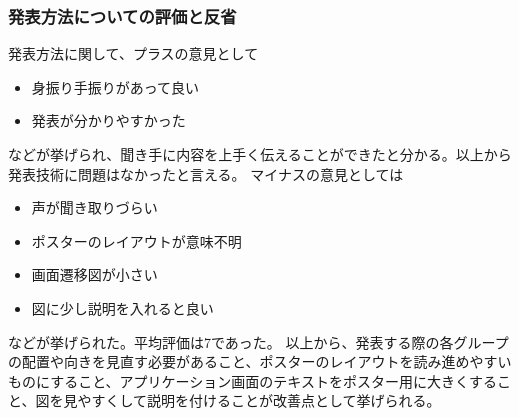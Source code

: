 \documentclass[openany,11pt,papersize]{jsbook}
\begin{document}
\subsubsection{発表方法についての評価と反省}
発表方法に関して、プラスの意見として
\begin{itemize}

\item 身振り手振りがあって良い
\item 発表が分かりやすかった

\end{itemize}
などが挙げられ、聞き手に内容を上手く伝えることができたと分かる。以上から発表技術に問題はなかったと言える。
マイナスの意見としては
\begin{itemize}

\item 声が聞き取りづらい
\item ポスターのレイアウトが意味不明
\item 画面遷移図が小さい
\item 図に少し説明を入れると良い

\end{itemize}
などが挙げられた。平均評価は7であった。
以上から、発表する際の各グループの配置や向きを見直す必要があること、ポスターのレイアウトを読み進めやすいものにすること、アプリケーション画面のテキストをポスター用に大きくすること、図を見やすくして説明を付けることが改善点として挙げられる。

\end{document}
